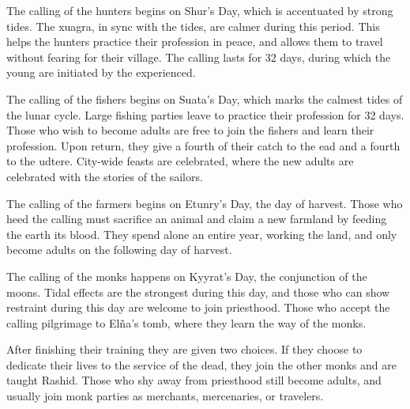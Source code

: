 The calling of the hunters begins on Shur's Day, which is accentuated by strong tides.
The xuagra, in sync with the tides, are calmer during this period.
This helps the hunters practice their profession in peace, and allows them to travel without fearing for their village.
The calling lasts for 32 days, during which the young are initiated by the experienced.

The calling of the fishers begins on Suata's Day, which marks the calmest tides of the lunar cycle.
Large fishing parties leave to practice their profession for 32 days.
Those who wish to become adults are free to join the fishers and learn their profession.
Upon return, they give a fourth of their catch to the ead and a fourth to the udtere.
City-wide feasts are celebrated, where the new adults are celebrated with the stories of the sailors.

The calling of the farmers begins on Etunry's Day, the day of harvest.
Those who heed the calling must sacrifice an animal and claim a new farmland by feeding the earth its blood.
They spend alone an entire year, working the land, and only become adults on the following day of harvest.

The calling of the monks happens on Kyyrat's Day, the conjunction of the moons.
Tidal effects are the strongest during this day, and those who can show restraint during this day are welcome to join priesthood.
Those who accept the calling pilgrimage to El\~na's tomb, where they learn the way of the monks.

After finishing their training they are given two choices.
If they choose to dedicate their lives to the service of the dead, they join the other monks and are taught Rashid.
Those who shy away from priesthood still become adults, and usually join monk parties as merchants, mercenaries, or travelers.




